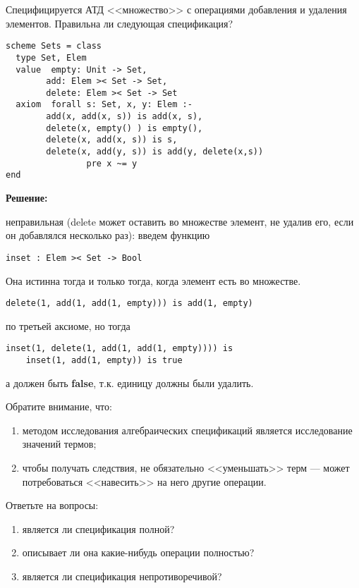 

\z Специфицируется АТД <<множество>> с операциями добавления и удаления элементов. Правильна ли следующая спецификация?
\begin{lstlisting}
scheme Sets = class
  type Set, Elem
  value  empty: Unit -> Set,
        add: Elem >< Set -> Set,
        delete: Elem >< Set -> Set
  axiom  forall s: Set, x, y: Elem :-
        add(x, add(x, s)) is add(x, s),
        delete(x, empty() ) is empty(),
        delete(x, add(x, s)) is s,
        delete(x, add(y, s)) is add(y, delete(x,s))
                pre x ~= y
end
\end{lstlisting}

\textbf{Решение:}

неправильная (delete может оставить во множестве элемент, не удалив его, если он добавлялся несколько раз): введем функцию
\begin{lstlisting}
inset : Elem >< Set -> Bool
\end{lstlisting}
Она истинна тогда и только тогда, когда элемент есть во множестве.
\begin{lstlisting}
delete(1, add(1, add(1, empty))) is add(1, empty)
\end{lstlisting} по третьей аксиоме, но тогда
\begin{lstlisting}
inset(1, delete(1, add(1, add(1, empty)))) is
    inset(1, add(1, empty)) is true
\end{lstlisting}
а должен быть \textbf{false}, т.к. единицу должны были удалить.

Обратите внимание, что:
\begin{enumerate}
  \item методом исследования алгебраических спецификаций является исследование значений термов;
  \item чтобы получать следствия, не обязательно <<уменьшать>> терм --- может потребоваться <<навесить>> на него другие операции.
\end{enumerate}

Ответьте на вопросы:
\begin{enumerate}
  \item является ли спецификация полной?
  \item описывает ли она какие-нибудь операции полностью?
  \item является ли спецификация непротиворечивой?
\end{enumerate}

